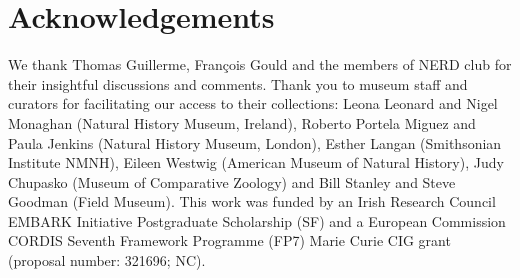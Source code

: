 \documentclass[12pt,a4paper]{article}
\begin{document}
\section{Acknowledgements}
	We thank Thomas Guillerme, Fran\c{c}ois Gould and the members of NERD club for their insightful discussions and comments. Thank you to museum staff and curators for facilitating our access to their collections: Leona Leonard and Nigel Monaghan (Natural History Museum, Ireland), Roberto Portela Miguez and Paula Jenkins (Natural History Museum, London), Esther Langan (Smithsonian Institute NMNH), Eileen Westwig (American Museum of Natural History), Judy Chupasko (Museum of Comparative Zoology) and Bill Stanley and Steve Goodman (Field Museum). This work was funded by an Irish Research Council EMBARK Initiative Postgraduate Scholarship (SF) and a European Commission CORDIS Seventh Framework Programme (FP7) Marie Curie CIG grant (proposal number: 321696; NC).
	
 
 
\end{document}
